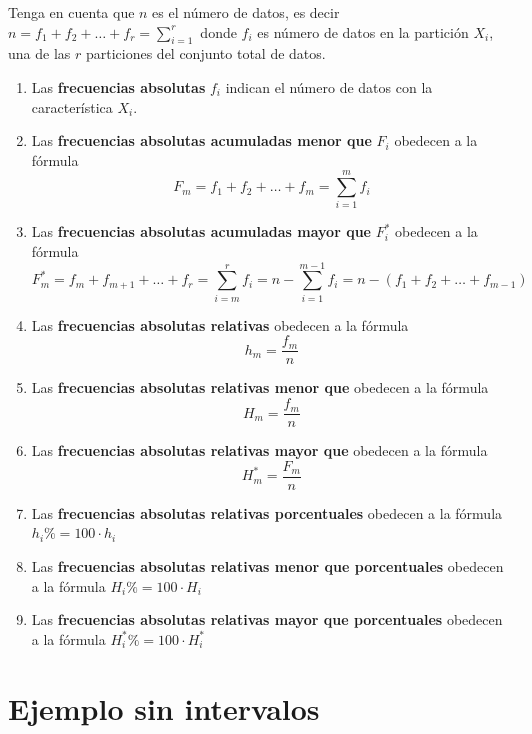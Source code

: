 \documentclass[10pt,]{krantz}
\theoremstyle{definition}
\theoremstyle{definition}
\theoremstyle{definition}
\theoremstyle{definition}
\theoremstyle{remark}
\begin{document}
Tenga en cuenta que \(n\) es el número de datos, es decir \(n=f_1+f_2+\ldots+f_r=\sum_{i=1}^r\) donde \(f_i\) es número de datos en la partición \(X_i\), una de las \(r\) particiones del conjunto total de datos.

\begin{enumerate}
\def\labelenumi{\arabic{enumi}.}
\item
  Las \textbf{frecuencias absolutas} \(f_i\) indican el número de datos con la característica \(X_i\).
\item
  Las \textbf{frecuencias absolutas acumuladas menor que} \(F_i\) obedecen a la fórmula
  \[F_m=f_1+f_2+\ldots+f_m=\sum_{i=1}^mf_i\]
\item
  Las \textbf{frecuencias absolutas acumuladas mayor que} \(F_i^*\) obedecen a la fórmula
  \[F_m^*=f_m+f_{m+1}+\ldots+f_r=\sum_{i=m}^rf_i=n-\sum_{i=1}^{m-1}f_i=n-\left(f_1+f_{2}+\ldots+f_{m-1}\right)\]
\item
  Las \textbf{frecuencias absolutas relativas} obedecen a la fórmula
  \[h_m=\frac{f_m}{n}\]
\item
  Las \textbf{frecuencias absolutas relativas menor que} obedecen a la fórmula
  \[H_m=\frac{f_m}{n}\]
\item
  Las \textbf{frecuencias absolutas relativas mayor que} obedecen a la fórmula
  \[H_m^*=\frac{F_m}{n}\]
\item
  Las \textbf{frecuencias absolutas relativas porcentuales} obedecen a la fórmula
  \(h_i\%=100\cdot h_i\)
\item
  Las \textbf{frecuencias absolutas relativas menor que porcentuales} obedecen a la fórmula
  \(H_i\%=100\cdot H_i\)
\item
  Las \textbf{frecuencias absolutas relativas mayor que porcentuales} obedecen a la fórmula
  \(H_i^*\%=100\cdot H_i^*\)
\end{enumerate}

\hypertarget{ejemplo-sin-intervalos}{%
\section{Ejemplo sin intervalos}\label{ejemplo-sin-intervalos}}
\end{document}
